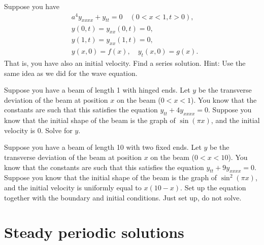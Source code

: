 \begin{exercise}
Suppose you have 
\begin{equation*}
\begin{aligned}
& a^4 y_{xxxx} + y_{tt} = 0 \quad (0 < x < 1, t > 0) , \\
& y(0,t) = y_{xx}(0,t) = 0,\\
& y(1,t) = y_{xx}(1,t) = 0 ,\\
& y(x,0) = f(x), \quad y_{t}(x,0) = g(x) .
\end{aligned}
\end{equation*}
That is, you have also an initial velocity.  Find a series solution.  Hint:
Use the same idea as we did for the wave equation.
\end{exercise}

\setcounter{exercise}{100}

\begin{exercise}
Suppose you have a beam of length 1 with hinged ends.  Let $y$ be the
transverse deviation of the beam at position $x$ on the beam ($0 < x < 1$).
You know that the
constants are such that this satisfies the equation $y_{tt} + 4 y_{xxxx} =
0$.   Suppose you know that the initial shape of the beam is the graph of
$\sin (\pi x)$, and the initial velocity is 0.  Solve for $y$.
\end{exercise}

\begin{exercise}
Suppose you have a beam of length 10 with two fixed ends.  Let $y$ be the
transverse deviation of the beam at position $x$ on the beam ($0 < x < 10$).
You know that the
constants are such that this satisfies the equation $y_{tt} + 9 y_{xxxx} =
0$.   Suppose you know that the initial shape of the beam is the graph of
$\sin^2(\pi x)$, and the initial velocity is uniformly equal to $x(10-x)$.
Set up the equation together with the
boundary and initial conditions.  Just set up, do not solve.
\end{exercise}


\sectionnewpage
\section{Steady periodic solutions}
\label{sps:section}

